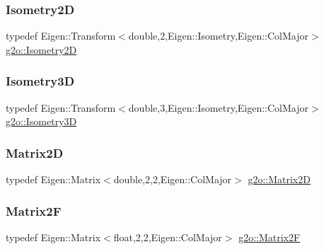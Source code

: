 \mbox{\label{namespaceg2o_a24614fc78fff981b779fbf4850b19101}} 
\subsubsection{\texorpdfstring{Isometry2D}{Isometry2D}}
{\footnotesize\ttfamily typedef Eigen\+::\+Transform$<$double,2,Eigen\+::\+Isometry,Eigen\+::\+Col\+Major$>$ \mbox{\hyperlink{namespaceg2o_a24614fc78fff981b779fbf4850b19101}{g2o\+::\+Isometry2D}}}

\mbox{\label{namespaceg2o_af8f6c8f7db82618f6bab6bbe448806eb}} 
\subsubsection{\texorpdfstring{Isometry3D}{Isometry3D}}
{\footnotesize\ttfamily typedef Eigen\+::\+Transform$<$double,3,Eigen\+::\+Isometry,Eigen\+::\+Col\+Major$>$ \mbox{\hyperlink{namespaceg2o_af8f6c8f7db82618f6bab6bbe448806eb}{g2o\+::\+Isometry3D}}}

\mbox{\label{namespaceg2o_ab45dbd73bc096222cf5688ea45b04eba}} 
\subsubsection{\texorpdfstring{Matrix2D}{Matrix2D}}
{\footnotesize\ttfamily typedef Eigen\+::\+Matrix$<$double,2,2,Eigen\+::\+Col\+Major$>$ \mbox{\hyperlink{namespaceg2o_ab45dbd73bc096222cf5688ea45b04eba}{g2o\+::\+Matrix2D}}}

\mbox{\label{namespaceg2o_a07b62708470b4ff9ade2f9609e30310c}} 
\subsubsection{\texorpdfstring{Matrix2F}{Matrix2F}}
{\footnotesize\ttfamily typedef Eigen\+::\+Matrix$<$float,2,2,Eigen\+::\+Col\+Major$>$ \mbox{\hyperlink{namespaceg2o_a07b62708470b4ff9ade2f9609e30310c}{g2o\+::\+Matrix2F}}}

\mbox{\label{namespaceg2o_ac9319963099ff600cf7c6251d7e937e1}} 
